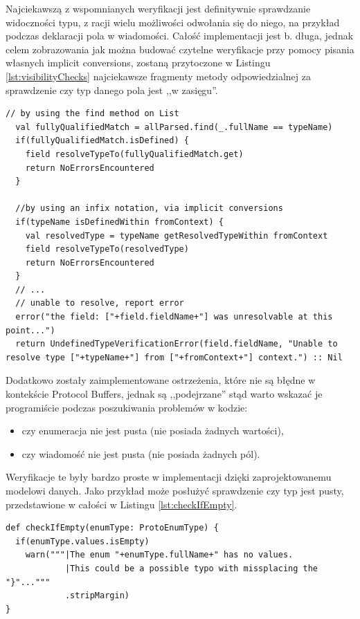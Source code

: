 \documentclass[pdflatex,11pt]{aghdpl}
\begin{document}
Najciekawszą z wspomnianych weryfikacji jest definitywnie sprawdzanie widoczności typu, z racji wielu możliwości odwołania się do niego,
na przykład podczas deklaracji pola w wiadomości. Całość implementacji jest b. długa, jednak celem zobrazowania jak można budować czytelne weryfikacje
przy pomocy pisania własnych implicit conversions, zostaną przytoczone w Listingu \ref{lst:visibilityChecks} najciekawsze fragmenty metody odpowiedzialnej
za sprawdzenie czy typ danego pola jest ,,w zasięgu''.

\begin{lstlisting}[caption={Ważniejsze fragmenty implementacji sprawdzania widoczności typu}, label={lst:visibilityChecks}]
  // by using the find method on List
  val fullyQualifiedMatch = allParsed.find(_.fullName == typeName)
  if(fullyQualifiedMatch.isDefined) {
    field resolveTypeTo(fullyQualifiedMatch.get)      
    return NoErrorsEncountered
  } 
    
  //by using an infix notation, via implicit conversions
  if(typeName isDefinedWithin fromContext) {
    val resolvedType = typeName getResolvedTypeWithin fromContext
    field resolveTypeTo(resolvedType)      
    return NoErrorsEncountered
  }
  // ... 
  // unable to resolve, report error
  error("the field: ["+field.fieldName+"] was unresolvable at this point...")
  return UndefinedTypeVerificationError(field.fieldName, "Unable to resolve type ["+typeName+"] from ["+fromContext+"] context.") :: Nil
\end{lstlisting}


Dodatkowo zostały zaimplementowane ostrzeżenia, które nie są błędne w kontekście Protocol Buffers,
jednak są ,,podejrzane'' stąd warto wskazać je programiście podczas poszukiwania problemów w kodzie:

\begin{itemize}
 \item czy enumeracja nie jest pusta (nie posiada żadnych wartości),
 \item czy wiadomość nie jest pusta (nie posiada żadnych pól).
\end{itemize}

Weryfikacje te były bardzo proste w implementacji dzięki zaprojektowanemu modelowi danych. Jako przykład może posłużyć sprawdzenie czy typ jest pusty, 
przedstawione w całości w Listingu \ref{lst:checkIfEmpty}.

\begin{lstlisting}[caption={Implementacja ostrzeżenia czy enumeracja jest pusta}, label={lst:checkIfEmpty}]
def checkIfEmpty(enumType: ProtoEnumType) {
  if(enumType.values.isEmpty)
    warn("""|The enum "+enumType.fullName+" has no values.
            |This could be a possible typo with missplacing the "}"..."""
            .stripMargin)
}
\end{lstlisting}
\end{document}
